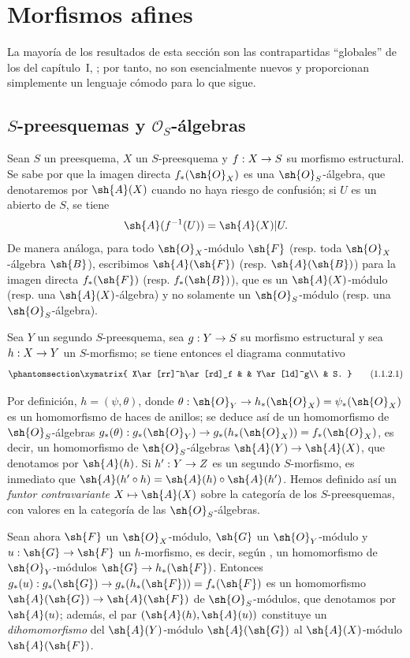 \documentclass[oneside,10pt]{amsart}
\makeatletter
\newcommand{\ega@arrow}[2]{\mathchoice{#1}{#2}{#2}{#2}}
\let\ega@shortmapsto\mapsto
\renewcommand{\to}{\ega@arrow{\longrightarrow}{\rightarrow}}
\renewcommand{\mapsto}{\ega@arrow{\longmapsto}{\ega@shortmapsto}}
\newcommand{\oldpage}[2][]{\marginnote{\normalfont\footnotesize\textbf{#1}~|~#2}\ignorespaces}
\let\EGAOriginalLabel\label
\renewcommand{\label}[1]{\phantomsection\EGAOriginalLabel{#1}}
\makeatother
\begin{document}
\section{Morfismos afines}
\label{section:II.1}

La mayoría de los resultados de esta sección son las contrapartidas ``globales'' de los del capítulo~I, ; por tanto, no son esencialmente nuevos y proporcionan simplemente un lenguaje cómodo para lo que sigue.
\bigskip

\subsection{$S$-preesquemas y $\mathcal{O}_S$-álgebras}
\label{subsection:II.1.1}

\begin{env}[1.1.1]
\label{II.1.1.1}
Sean $S$ un preesquema, $X$ un $S$-preesquema y $f:X\to S$ su morfismo estructural.
Se sabe por  que la imagen directa $f_*(\sh{O}_X)$ es una $\sh{O}_S$-álgebra, que
\oldpage[II]{6}
denotaremos por $\sh{A}(X)$ cuando no haya riesgo de confusión; si $U$ es un abierto de $S$, se tiene
\[
  \sh{A}(f^{-1}(U))=\sh{A}(X)|U.
\]
De manera análoga, para todo $\sh{O}_X$-módulo $\sh{F}$ (resp. toda $\sh{O}_X$-álgebra $\sh{B}$), escribimos $\sh{A}(\sh{F})$ (resp. $\sh{A}(\sh{B})$) para la imagen directa $f_*(\sh{F})$ (resp. $f_*(\sh{B})$), que es un $\sh{A}(X)$-módulo (resp. una $\sh{A}(X)$-álgebra) y no solamente un $\sh{O}_S$-módulo (resp. una $\sh{O}_S$-álgebra).
\end{env}

\begin{env}[1.1.2]
\label{II.1.1.2}
Sea $Y$ un segundo $S$-preesquema, sea $g:Y\to S$ su morfismo estructural y sea $h:X\to Y$ un $S$-morfismo; se tiene entonces el diagrama conmutativo
\[
\label{II.1.1.2.1}
  \xymatrix{
    X\ar[rr]^h\ar[rd]_f & &
    Y\ar[ld]^g\\
    & S.
  }
  \tag{1.1.2.1}
\]

Por definición, $h=(\psi,\theta)$, donde $\theta:\sh{O}_Y\to h_*(\sh{O}_X)=\psi_*(\sh{O}_X)$ es un homomorfismo de haces de anillos; se deduce así de  un homomorfismo de $\sh{O}_S$-álgebras $g_*(\theta):g_*(\sh{O}_Y)\to g_*(h_*(\sh{O}_X))=f_*(\sh{O}_X)$, es decir, un homomorfismo de $\sh{O}_S$-álgebras $\sh{A}(Y)\to\sh{A}(X)$, que denotamos por $\sh{A}(h)$.
Si $h':Y\to Z$ es un segundo $S$-morfismo, es inmediato que $\sh{A}(h'\circ h)=\sh{A}(h)\circ\sh{A}(h')$.
Hemos definido así un \emph{funtor contravariante $X\mapsto\sh{A}(X)$} sobre la categoría de los $S$-preesquemas, con valores en la categoría de las $\sh{O}_S$-álgebras.

Sean ahora $\sh{F}$ un $\sh{O}_X$-módulo, $\sh{G}$ un $\sh{O}_Y$-módulo y $u:\sh{G}\to\sh{F}$ un $h$-morfismo, es decir, según , un homomorfismo de $\sh{O}_Y$-módulos $\sh{G}\to h_*(\sh{F})$.
Entonces $g_*(u):g_*(\sh{G})\to g_*(h_*(\sh{F}))=f_*(\sh{F})$ es un homomorfismo $\sh{A}(\sh{G})\to\sh{A}(\sh{F})$ de $\sh{O}_S$-módulos, que denotamos por $\sh{A}(u)$; además, el par $(\sh{A}(h),\sh{A}(u))$ constituye un \emph{dihomomorfismo} del $\sh{A}(Y)$-módulo $\sh{A}(\sh{G})$ al $\sh{A}(X)$-módulo $\sh{A}(\sh{F})$.
\end{env}
\end{document}
